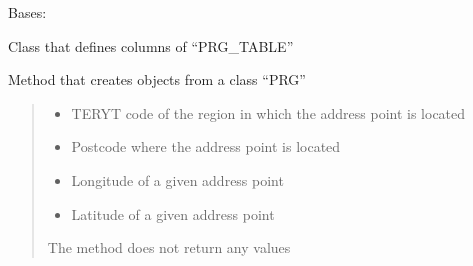 \documentclass[letterpaper,10pt,english]{sphinxmanual}
\begin{document}
\begin{fulllineitems}
\label{\detokenize{pcm_db:pcm_db.PRG}}
\pysigstartsignatures
{}
\pysigstopsignatures
\sphinxAtStartPar
Bases: 

\sphinxAtStartPar
Class that defines columns of “PRG\_TABLE”

\begin{fulllineitems}
\label{\detokenize{pcm_db:pcm_db.PRG.__init__}}
\pysigstartsignatures
{}
\pysigstopsignatures
\sphinxAtStartPar
Method that creates objects from a class “PRG”
\begin{quote}\begin{description}
\begin{itemize}
\item {} 
\sphinxAtStartPar
{} \textendash{} TERYT code of the region in which the address point is located

\item {} 
\sphinxAtStartPar
{} \textendash{} Postcode where the address point is located

\item {} 
\sphinxAtStartPar
{} \textendash{} Longitude of a given address point

\item {} 
\sphinxAtStartPar
{} \textendash{} Latitude of a given address point

\end{itemize}

\sphinxAtStartPar
The method does not return any values

\end{description}\end{quote}


\end{fulllineitems}
\end{fulllineitems}
\end{document}
